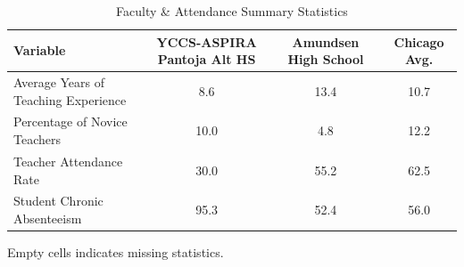 \begin{table}[H]
\renewcommand{\arraystretch}{1.5}
\caption*{
{\large Faculty \& Attendance Summary Statistics}
} 

\fontsize{10pt}{11pt}\selectfont

\begin{tabular*}{\linewidth}{@{\extracolsep{\fill}}lccc}
\toprule
Variable & YCCS-ASPIRA Pantoja Alt HS & Amundsen High School & Chicago Avg. \\ 
\midrule\addlinespace[2.5pt]
Average Years of Teaching Experience & 8.6 & 13.4 & 10.7 \\
Percentage of Novice Teachers & 10.0 & 4.8 & 12.2 \\
Teacher Attendance Rate & 30.0 & 55.2 & 62.5 \\
Student Chronic Absenteeism & 95.3 & 52.4 & 56.0 \\
\bottomrule
\end{tabular*}
\begin{minipage}{\linewidth}
Empty cells indicates missing statistics.\\
\end{minipage}
\end{table}
